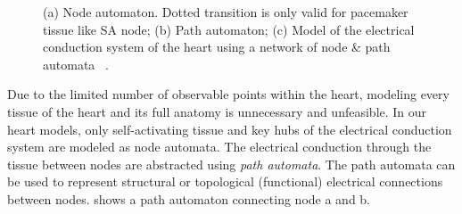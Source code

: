 \begin{figure}[!t]
\centering
\label{fig:h_automatas}
\caption{\small (a) Node automaton. Dotted transition is only valid for pacemaker tissue like SA node; (b) Path automaton; (c) Model of the electrical conduction system of the heart using a network of node \& path automata ~\cite{VHM_proc}.}
\end{figure} 

Due to the limited number of observable points within the heart, modeling every tissue of the heart and its full anatomy is unnecessary and unfeasible. In our heart models, only self-activating tissue and key hubs of the electrical conduction system are modeled as node automata. The electrical conduction through the tissue between nodes are abstracted using \emph{path automata}. The path automata can be used to represent structural or topological (functional) electrical connections between nodes.  shows a path automaton connecting node a and b.

